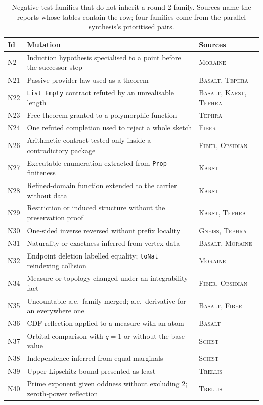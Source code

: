 \documentclass[11pt,a4paper]{article}
\newcommand{\code}[1]{\nolinkurl{#1}}
\newcommand{\Bs}{\textsc{Basalt}}
\newcommand{\Fb}{\textsc{Fiber}}
\newcommand{\Gn}{\textsc{Gneiss}}
\newcommand{\Ks}{\textsc{Karst}}
\newcommand{\Mr}{\textsc{Moraine}}
\newcommand{\Ob}{\textsc{Obsidian}}
\newcommand{\Sc}{\textsc{Schist}}
\newcommand{\Tp}{\textsc{Tephra}}
\newcommand{\Tr}{\textsc{Trellis}}
\theoremstyle{definition}
\begin{document}
\begin{table}[htbp]
\centering\small
\caption{Negative-test families that do not inherit a round-2 family. Sources name the reports whose tables contain the row; four families come from the parallel synthesis's prioritised pairs.}
\label{tab:newfam}
\begin{tabularx}{\textwidth}{@{}L{8mm}L{86mm}L{54mm}@{}}
\toprule
Id & Mutation & Sources\\
\midrule
N2 & Induction hypothesis specialised to a point before the successor step & \Mr\\
N21 & Passive provider law used as a theorem & \Bs, \Tp\\
N22 & \code{List Empty} contract refuted by an unrealisable length & \Bs, \Ks, \Tp\\
N23 & Free theorem granted to a polymorphic function & \Tp\\
N24 & One refuted completion used to reject a whole sketch & \Fb\\
N26 & Arithmetic contract tested only inside a contradictory package & \Fb, \Ob\\
N27 & Executable enumeration extracted from \code{Prop} finiteness & \Ks\\
N28 & Refined-domain function extended to the carrier without data & \Ks\\
N29 & Restriction or induced structure without the preservation proof & \Ks, \Tp\\
N30 & One-sided inverse reversed without prefix locality & \Gn, \Tp\\
N31 & Naturality or exactness inferred from vertex data & \Bs, \Mr\\
N32 & Endpoint deletion labelled equality; \code{toNat} reindexing collision & \Mr\\
N34 & Measure or topology changed under an integrability fact & \Fb, \Ob\\
N35 & Uncountable a.e.\ family merged; a.e.\ derivative for an everywhere one & \Bs, \Fb\\
N36 & CDF reflection applied to a measure with an atom & \Bs\\
N37 & Orbital comparison with $q=1$ or without the base value & \Sc\\
N38 & Independence inferred from equal marginals & \Sc\\
N39 & Upper Lipschitz bound presented as least & \Tr\\
N40 & Prime exponent given oddness without excluding $2$; zeroth-power reflection & \Tr\\

\end{tabularx}
\end{table}
\end{document}
